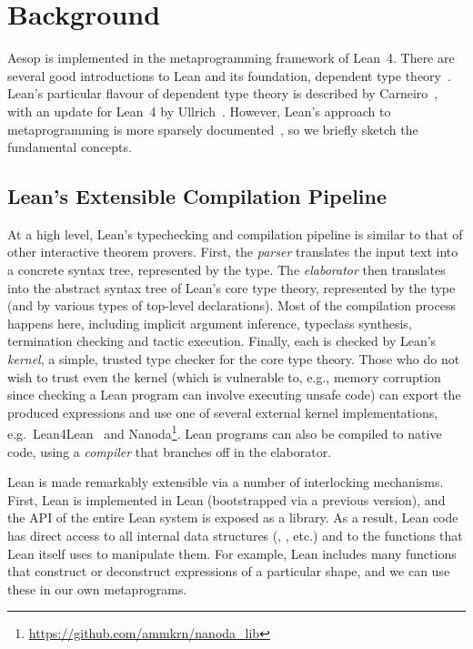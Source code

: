 \chapter{Background}%
\label{chap:background}

Aesop is implemented in the metaprogramming framework of Lean~4.
There are several good introductions to Lean and its foundation, dependent type theory~\cite{TPIL4,MathInLean,hottbook}.
Lean's particular flavour of dependent type theory is described by Carneiro~\cite{Carneiro19}, with an update for Lean~4 by Ullrich~\cite{Ullrich23}.
However, Lean's approach to metaprogramming is more sparsely documented~\cite{MetaBook}, so we briefly sketch the fundamental concepts.

\section{Lean's Extensible Compilation Pipeline}

At a high level, Lean's typechecking and compilation pipeline is similar to that of other interactive theorem provers.
First, the \emph{parser} translates the input text into a concrete syntax tree, represented by the  type.
The \emph{elaborator} then translates  into the abstract syntax tree of Lean's core type theory, represented by the  type (and by various types of top-level declarations).
Most of the compilation process happens here, including implicit argument inference, typeclass synthesis, termination checking and tactic execution.
Finally, each  is checked by Lean's \emph{kernel}, a simple, trusted type checker for the core type theory.
Those who do not wish to trust even the kernel (which is vulnerable to, e.g., memory corruption since checking a Lean program can involve executing unsafe code) can export the produced expressions and use one of several external kernel implementations, e.g.\ Lean4Lean~\cite{Lean4Lean} and Nanoda\footnote{\url{https://github.com/ammkrn/nanoda_lib}}.
Lean programs can also be compiled to native code, using a \emph{compiler} that branches off in the elaborator.

Lean is made remarkably extensible via a number of interlocking mechanisms.
First, Lean is implemented in Lean (bootstrapped via a previous version), and the API of the entire Lean system is exposed as a library.
As a result, Lean code has direct access to all internal data structures (, , etc.) and to the functions that Lean itself uses to manipulate them.
For example, Lean includes many functions that construct or deconstruct expressions of a particular shape, and we can use these in our own metaprograms.

